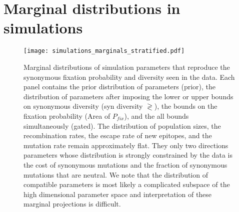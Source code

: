 \newpage
\section{Marginal distributions in simulations}
\begin{figure}[h]
\begin{center}
\texttt{[image: simulations\_marginals\_stratified.pdf]}
\caption{
Marginal distributions of simulation parameters that reproduce the
synonymous fixation probability and diversity seen in the data. Each
panel contains the prior distribution of parameters (prior), the distribution of
parameters after imposing the lower or upper bounds on synonymous
diversity (syn diversity $\gtrless$), the bounds on the fixation
probability (Area of $P_{fix}$), and the all bounds
simultaneously (gated). The distribution of population sizes, the recombination rates, the escape
rate of new epitopes, and the mutation rate remain approximately
flat. They only two directions parameters whose distribution is strongly
constrained by the data is the cost of synonymous mutations and the
fraction of synonymous mutations that are neutral. We note that the
distribution of compatible parameters is most likely a complicated
subspace of the high dimensional parameter space and interpretation of
these marginal projections is difficult. 
}
\label{fig:sims_altparameters}
\end{center}
\end{figure}



